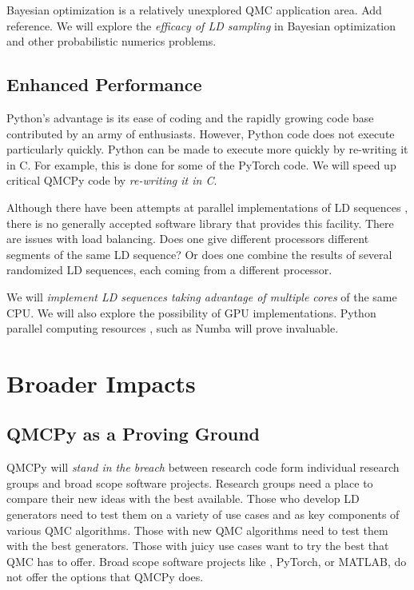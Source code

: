 \documentclass[11pt]{NSFamsart}
\begin{document}
Bayesian optimization is a relatively unexplored QMC application area. Add \cite{chen2019hierarchical} reference. We will explore the \emph{efficacy of LD sampling} in Bayesian optimization and other probabilistic numerics problems.



\subsection{Enhanced Performance}
Python's advantage is its ease of coding and the rapidly growing code base contributed by an army of enthusiasts.  However, Python code does not execute particularly quickly.  Python can be made to execute more quickly by re-writing it in C.  For example, this is done for some of the PyTorch code.  We will speed up critical QMCPy code by \emph{re-writing it in C}.  

Although there have been attempts at parallel implementations of LD sequences \cite{LiMul00a,OktSri02, SchUhl01,WanEtal06a,LiuHic04a}, there is no generally accepted software library that provides this facility.  There are issues with load balancing.  Does one give different processors different segments of the same LD sequence?  Or does one combine the results of several randomized LD sequences, each coming from a different processor.

We will \emph{implement LD sequences taking advantage of multiple cores} of the same CPU.  We will also explore the possibility of GPU implementations.  Python parallel computing resources \cite{ParallelPython}, such as Numba \cite{Numba} will prove invaluable.



\section{Broader Impacts}
\subsection{QMCPy as a Proving Ground}
QMCPy will \emph{stand in the breach} between research code form individual research groups and broad scope software projects.  Research groups need a place to compare their new ideas with the best available.  Those who develop LD generators need to test them on a variety of use cases and as key components of various QMC algorithms.  Those with new QMC algorithms need to test them with the best generators.  Those with juicy use cases want to try the best that QMC has to offer.  Broad scope software projects like , PyTorch, or MATLAB, do not offer the options that QMCPy does.
\end{document}
